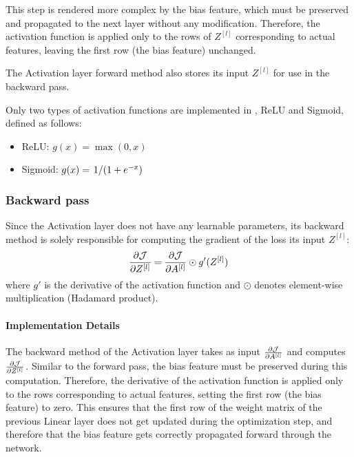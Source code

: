 This step is rendered more complex by the bias feature, which must be preserved and propagated to the next layer without any modification. Therefore, the activation function is applied only to the rows of $Z^{[l]}$ corresponding to actual features, leaving the first row (the bias feature) unchanged.

The Activation layer forward method also stores its input $Z^{[l]}$ for use in the backward pass.

Only two types of activation functions are implemented in \mfnet, ReLU and Sigmoid, defined as follows:
\begin{itemize}
    \item ReLU: $g(x) = \max(0, x)$
    \item Sigmoid: $g(x) = \flatfrac{1}{(1 + e^{-x})}$
\end{itemize}

\subsubsection{Backward pass}
Since the Activation layer does not have any learnable parameters, its backward method is solely responsible for computing the gradient of the loss \wrt its input $Z^{[l]}$:
\begin{equation}
    \pdv{\mathcal{J}}{Z^{[l]}} = \pdv{\mathcal{J}}{A^{[l]}} \odot g'(Z^{[l]})
\end{equation}
where $g'$ is the derivative of the activation function and $\odot$ denotes element-wise multiplication (Hadamard product).

\paragraph{Implementation Details} The backward method of the Activation layer takes as input $\pdv{\mathcal{J}}{A^{[l]}}$ and computes $\pdv{\mathcal{J}}{Z^{[l]}}$. Similar to the forward pass, the bias feature must be preserved during this computation. Therefore, the derivative of the activation function is applied only to the rows corresponding to actual features, setting the first row (the bias feature) to zero. This ensures that the first row of the weight matrix of the previous Linear layer does not get updated during the optimization step, and therefore that the bias feature gets correctly propagated forward through the network.
